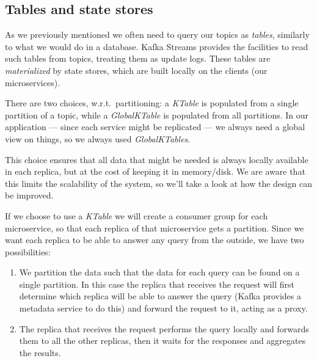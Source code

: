\pagebreak

\subsection{Tables and state stores}

As we previously mentioned we often need to query our topics as \emph{tables}, similarly to what we would do in a database. Kafka Streams provides the facilities to read such tables from topics, treating them as update logs.
These tables are \emph{materialized} by state stores, which are built locally on the clients (our microservices).

There are two choices, w.r.t.\ partitioning: a \emph{KTable} is populated from a single partition of a topic, while a \emph{GlobalKTable} is populated from all partitions.
In our application — since each service might be replicated — we always need a global view on things, so we always used \emph{GlobalKTables}.

This choice ensures that all data that might be needed is always locally available in each replica, but at the cost of keeping it in memory/disk. We are aware that this limits the scalability of the system, so we'll take a look at how the design can be improved.

If we choose to use a \emph{KTable} we will create a consumer group for each microservice, so that each replica of that microservice gets a partition. Since we want each replica to be able to answer any query from the outside, we have two possibilities:
\begin{enumerate}
    \item We partition the data such that the data for each query can be found on a single partition. In this case the replica that receives the request will first determine which replica will be able to answer the query (Kafka provides a metadata service to do this) and forward the request to it, acting as a proxy.
    \item The replica that receives the request performs the query locally and forwards them to all the other replicas, then it waits for the responses and aggregates the results.
\end{enumerate}

